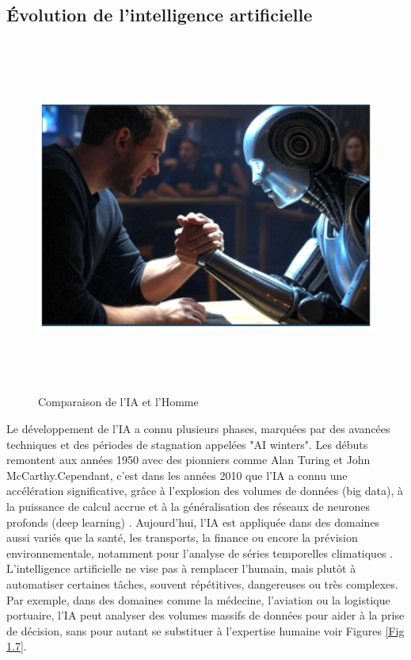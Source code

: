 \documentclass[a4paper,12pt,openany]{report}
\begin{document}
	\subsection{Évolution de l’intelligence artificielle}
		\begin{figure}[H]
		\begin{center}
	    	    \begin{minipage}{\textwidth}
	    	     \begin{center}
	    	      \includegraphics[width=1\textwidth,height=4.6in]{images/IA_vas_nous_remplacer.png}
	    	      
	    	      \end{center}
	    	     \end{minipage}
			
			\caption{Comparaison de l'IA et l'Homme\cite{Goodfellow2016}\label{Fig 1.6}}
		\end{center}
	\end{figure}%
 \quad Le développement de l’IA a connu plusieurs phases, marquées par des avancées techniques et des périodes de stagnation appelées "AI winters". Les débuts remontent aux années 1950 avec des pionniers comme Alan Turing et John McCarthy.Cependant, c’est dans les années 2010 que l’IA a connu une accélération significative, grâce à l’explosion des volumes de données (big data), à la puissance de calcul accrue  et à la généralisation des réseaux de neurones profonds (deep learning) \cite{Goodfellow2016}.
	Aujourd’hui, l’IA est appliquée dans des domaines aussi variés que la santé, les transports, la finance ou encore la prévision environnementale, notamment pour l’analyse de séries temporelles climatiques  \cite{LeCun2015} .
	\quad L’intelligence artificielle ne vise pas à remplacer l’humain, mais plutôt à automatiser certaines tâches, souvent répétitives, dangereuses ou très complexes. Par exemple, dans des domaines comme la médecine, l’aviation ou la logistique portuaire, l’IA peut analyser des volumes massifs de données pour aider à la prise de décision, sans pour autant se substituer à l’expertise humaine voir Figures \ref{Fig 1.7}.
\end{document}
